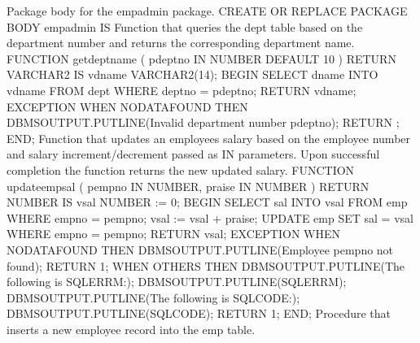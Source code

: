 \documentclass[letterpaper,10pt,english,openany,oneside]{sphinxmanual}
\begin{document}
%
\begin{sphinxVerbatim}[commandchars=\\\{\}]
\PYGZhy{}\PYGZhy{}
\PYGZhy{}\PYGZhy{} Package body for the \PYGZsq{}emp\PYGZus{}admin\PYGZsq{} package.
\PYGZhy{}\PYGZhy{}
CREATE OR REPLACE PACKAGE BODY emp\PYGZus{}admin
IS
\PYGZhy{}\PYGZhy{}
    \PYGZhy{}\PYGZhy{} Function that queries the \PYGZsq{}dept\PYGZsq{} table based on the department
    \PYGZhy{}\PYGZhy{} number and returns the corresponding department name.
    \PYGZhy{}\PYGZhy{}
    FUNCTION get\PYGZus{}dept\PYGZus{}name (
        p\PYGZus{}deptno IN NUMBER DEFAULT 10
    )
    RETURN VARCHAR2
    IS
        v\PYGZus{}dname VARCHAR2(14);
    BEGIN
        SELECT dname INTO v\PYGZus{}dname FROM dept WHERE deptno = p\PYGZus{}deptno;
        RETURN v\PYGZus{}dname;
    EXCEPTION
        WHEN NO\PYGZus{}DATA\PYGZus{}FOUND THEN
            DBMS\PYGZus{}OUTPUT.PUT\PYGZus{}LINE(\PYGZsq{}Invalid department number \PYGZsq{} \textbar{}\textbar{} p\PYGZus{}deptno);
            RETURN \PYGZsq{}\PYGZsq{};
    END;
    \PYGZhy{}\PYGZhy{}
    \PYGZhy{}\PYGZhy{} Function that updates an employee\PYGZsq{}s salary based on the
    \PYGZhy{}\PYGZhy{} employee number and salary increment/decrement passed
    \PYGZhy{}\PYGZhy{} as IN parameters. Upon successful completion the function
    \PYGZhy{}\PYGZhy{} returns the new updated salary.
    \PYGZhy{}\PYGZhy{}
    FUNCTION update\PYGZus{}emp\PYGZus{}sal (
        p\PYGZus{}empno        IN NUMBER,
        p\PYGZus{}raise        IN NUMBER
    )
    RETURN NUMBER
    IS
        v\PYGZus{}sal          NUMBER := 0;
    BEGIN
        SELECT sal INTO v\PYGZus{}sal FROM emp WHERE empno = p\PYGZus{}empno;
        v\PYGZus{}sal := v\PYGZus{}sal + p\PYGZus{}raise;
        UPDATE emp SET sal = v\PYGZus{}sal WHERE empno = p\PYGZus{}empno;
        RETURN v\PYGZus{}sal;
    EXCEPTION
      WHEN NO\PYGZus{}DATA\PYGZus{}FOUND THEN
          DBMS\PYGZus{}OUTPUT.PUT\PYGZus{}LINE(\PYGZsq{}Employee \PYGZsq{} \textbar{}\textbar{} p\PYGZus{}empno \textbar{}\textbar{} \PYGZsq{} not found\PYGZsq{});
          RETURN \PYGZhy{}1;
      WHEN OTHERS THEN
          DBMS\PYGZus{}OUTPUT.PUT\PYGZus{}LINE(\PYGZsq{}The following is SQLERRM:\PYGZsq{});
          DBMS\PYGZus{}OUTPUT.PUT\PYGZus{}LINE(SQLERRM);
          DBMS\PYGZus{}OUTPUT.PUT\PYGZus{}LINE(\PYGZsq{}The following is SQLCODE:\PYGZsq{});
          DBMS\PYGZus{}OUTPUT.PUT\PYGZus{}LINE(SQLCODE);
          RETURN \PYGZhy{}1;
    END;
    \PYGZhy{}\PYGZhy{}
    \PYGZhy{}\PYGZhy{} Procedure that inserts a new employee record into the \PYGZsq{}emp\PYGZsq{} table.

\end{sphinxVerbatim}
\end{document}
